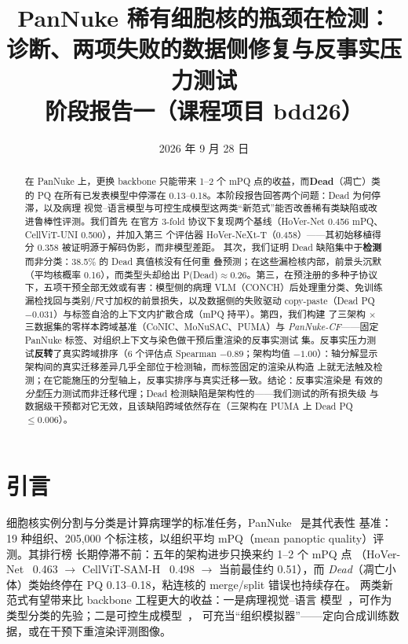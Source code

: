 \documentclass[11pt]{article}
\title{\bfseries PanNuke 稀有细胞核的瓶颈在检测：\\
诊断、两项失败的数据侧修复与反事实压力测试\\[6pt]
\large 阶段报告一（课程项目 bdd26）}
\author{}
\date{2026 年 9 月 28 日}
\begin{document}
\maketitle

\begin{abstract}
在 PanNuke 上，更换 backbone 只能带来 1--2 个 mPQ 点的收益，而\textbf{Dead}（凋亡）类
的 PQ 在所有已发表模型中停滞在 0.13--0.18。本阶段报告回答两个问题：Dead 为何停滞，以及病理
视觉--语言模型与可控生成模型这两类“新范式”能否改善稀有类缺陷或改进鲁棒性评测。我们首先
在官方 3-fold 协议下复现两个基线（HoVer-Net 0.456 mPQ、CellViT-UNI 0.500），并加入第三
个评估器 HoVer-NeXt-T（0.458）——其初始移植得分 0.358 被证明源于解码伪影，而非模型差距。
其次，我们证明 Dead 缺陷集中于\textbf{检测}而非分类：38.5\% 的 Dead 真值核没有任何重
叠预测；在这些漏检核内部，前景头沉默（平均核概率 0.16），而类型头却给出
P(Dead)$\approx$0.26。第三，在预注册的多种子协议下，五项干预全部无效或有害：模型侧的病理
VLM（CONCH）后处理重分类、免训练漏检找回与类别/尺寸加权的前景损失，以及数据侧的失败驱动
copy-paste（Dead PQ $-0.031$）与标签自洽的上下文内扩散合成（mPQ 持平）。第四，我们构建
了三架构 $\times$ 三数据集的零样本跨域基准（CoNIC、MoNuSAC、PUMA）与
\emph{PanNuke-CF}——固定 PanNuke 标签、对组织上下文与染色做干预后重渲染的反事实测试
集。反事实压力测试\textbf{反转}了真实跨域排序（6 个评估点 Spearman $-0.89$；架构均值
$-1.00$）：轴分解显示架构间的真实迁移差异几乎全部位于检测轴，而标签固定的渲染从构造
上就无法触及检测；在它能施压的分型轴上，反事实排序与真实迁移一致。结论：反事实渲染是
有效的\emph{分型}压力测试而非迁移代理；Dead 检测缺陷是架构性的——我们测试的所有损失级
与数据级干预都对它无效，且该缺陷跨域依然存在（三架构在 PUMA 上 Dead PQ $\le 0.006$）。
\end{abstract}

\section{引言}
\label{sec:intro}

细胞核实例分割与分类是计算病理学的标准任务，PanNuke~\cite{gamper2019pannuke} 是其代表性
基准：19 种组织、205,000 个标注核，以组织平均 mPQ（mean panoptic quality）评测。其排行榜
长期停滞不前：五年的架构进步只换来约 1--2 个 mPQ 点
（HoVer-Net~\cite{graham2019hovernet} 0.463 $\rightarrow$
CellViT-SAM-H~\cite{horta2024cellvit} 0.498 $\rightarrow$ 当前最佳约 0.51），而
\emph{Dead}（凋亡小体）类始终停在 PQ 0.13--0.18，粘连核的 merge/split 错误也持续存在。
两类新范式有望带来比 backbone 工程更大的收益：一是病理视觉--语言
模型~\cite{lu2024conch}，可作为类型分类的先验；二是可控生成模型~\cite{le2025pixcell}，
可充当“组织模拟器”——定向合成训练数据，或在干预下重渲染评测图像。
\end{document}
